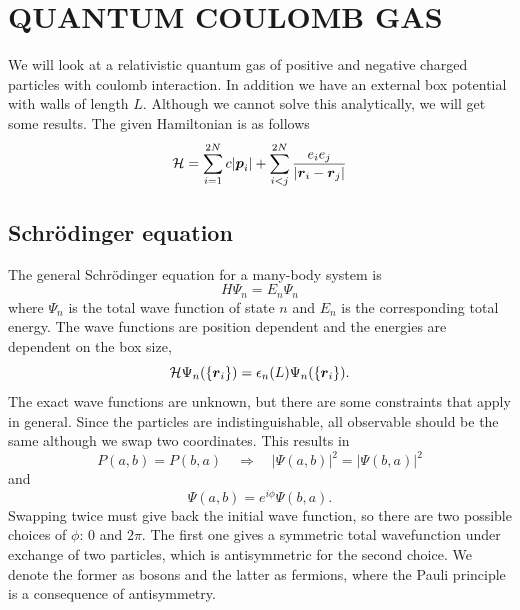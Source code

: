\documentclass[norsk,a4paper,12pt]{article}
\begin{document}
\newpage
\section{QUANTUM COULOMB GAS}
We will look at a relativistic quantum gas of positive and negative charged particles with coulomb interaction. In addition we have an external box potential with walls of length $L$. Although we cannot solve this analytically, we will get some results. The given Hamiltonian is as follows
\begin{equation}
{\cal H}=\sum_{i=1}^{2N}c|\boldsymbol{p}_i|+\sum_{i<j}^{2N}\frac{e_ie_j}{|\boldsymbol{r}_i - \boldsymbol{r}_j|}
\end{equation}

\subsection{Schrödinger equation}
The general Schrödinger equation for a many-body system is 
\begin{equation}
H\Psi_n=E_n\Psi_n
\end{equation}
where $\Psi_n$ is the total wave function of state $n$ and $E_n$ is the corresponding total energy. The wave functions are position dependent and the energies are dependent on the box size,
\begin{equation}
{\cal H}\Psi_n(\{\boldsymbol{r}_i\})=\epsilon_n(L)\Psi_n(\{\boldsymbol{r}_i\}).
\end{equation}
The exact wave functions are unknown, but there are some constraints that apply in general. Since the particles are indistinguishable, all observable should be the same although we swap two coordinates. This results in
\begin{equation}
P(a,b)=P(b,a)\quad\Rightarrow\quad |\Psi(a,b)|^2=|\Psi(b,a)|^2
\end{equation}
and
\begin{equation}
\Psi(a,b)=e^{i\phi}\Psi(b,a).
\end{equation}
Swapping twice must give back the initial wave function, so there are two possible choices of $\phi$: 0 and $2\pi$. The first one gives a symmetric total wavefunction under exchange of two particles, which is antisymmetric for the second choice. We denote the former as bosons and the latter as fermions, where the Pauli principle is a consequence of antisymmetry.
\end{document}
